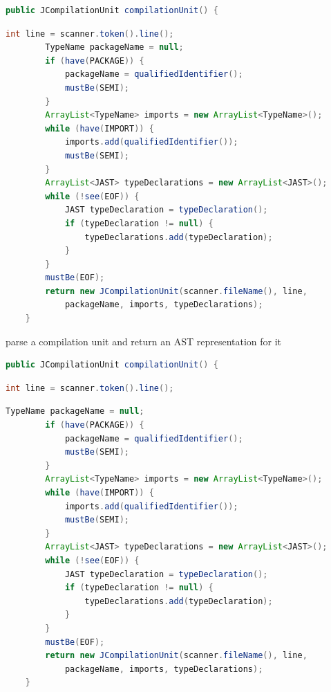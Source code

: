 \documentclass[8pt,a4paper,compress]{beamer}
\begin{document}
\begin{frame}[fragile]
\begin{overprint}
\begin{tcolorbox}[enhanced,drop shadow southwest,sharp corners,size=fbox,colback=white,fontlower=\small\ttfamily,collower=silver900]
\begin{lstlisting}[language=Java,style=focusin,backgroundcolor=\color{lime100}]
    public JCompilationUnit compilationUnit() {
\end{lstlisting}
\begin{lstlisting}[language=Java,style=focusout]
        int line = scanner.token().line();
        TypeName packageName = null;
        if (have(PACKAGE)) {
            packageName = qualifiedIdentifier();
            mustBe(SEMI);
        }
        ArrayList<TypeName> imports = new ArrayList<TypeName>();
        while (have(IMPORT)) {
            imports.add(qualifiedIdentifier());
            mustBe(SEMI);
        }
        ArrayList<JAST> typeDeclarations = new ArrayList<JAST>();
        while (!see(EOF)) {
            JAST typeDeclaration = typeDeclaration();
            if (typeDeclaration != null) {
                typeDeclarations.add(typeDeclaration);
            }
        }
        mustBe(EOF);
        return new JCompilationUnit(scanner.fileName(), line, 
            packageName, imports, typeDeclarations);
    }
\end{lstlisting}

\tcblower
\begin{minipage}[t][.2cm][t]{\textwidth}
parse a compilation unit and return an AST representation for it
\end{minipage}
\end{tcolorbox}

\begin{tcolorbox}[enhanced,drop shadow southwest,sharp corners,size=fbox,colback=white,fontlower=\small\ttfamily,collower=silver900]

\begin{lstlisting}[language=Java,style=focusout]
    public JCompilationUnit compilationUnit() {
\end{lstlisting}
\begin{lstlisting}[language=Java,style=focusin,backgroundcolor=\color{lime100}]
        int line = scanner.token().line();
\end{lstlisting}
\begin{lstlisting}[language=Java,style=focusout]
        TypeName packageName = null;
        if (have(PACKAGE)) {
            packageName = qualifiedIdentifier();
            mustBe(SEMI);
        }
        ArrayList<TypeName> imports = new ArrayList<TypeName>();
        while (have(IMPORT)) {
            imports.add(qualifiedIdentifier());
            mustBe(SEMI);
        }
        ArrayList<JAST> typeDeclarations = new ArrayList<JAST>();
        while (!see(EOF)) {
            JAST typeDeclaration = typeDeclaration();
            if (typeDeclaration != null) {
                typeDeclarations.add(typeDeclaration);
            }
        }
        mustBe(EOF);
        return new JCompilationUnit(scanner.fileName(), line, 
            packageName, imports, typeDeclarations);
    }
\end{lstlisting}


\end{tcolorbox}
\end{overprint}
\end{frame}
\end{document}
